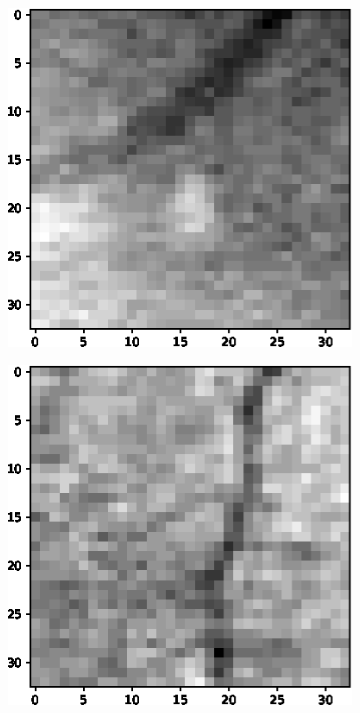 \documentclass[aps,prb,10pt,twocolumn,groupedaddress]{revtex4-1}
\begin{document}
\begin{figure}[!t]
\begin{subfigure}[]{0.22\textwidth}
		\caption{}
	\end{subfigure}\\
	\vspace{0.25cm}
	\centering
	\begin{subfigure}[]{0.22\textwidth}
		\centering
		\includegraphics[width=\textwidth]{images/negative1.eps}
		\caption{}
	\end{subfigure}
	\hspace{1.55cm}
	\centering
	\begin{subfigure}[]{0.22\textwidth}
		\centering
		\includegraphics[width=\textwidth]{images/negative2.eps}

\end{subfigure}
\end{figure}
\end{document}

